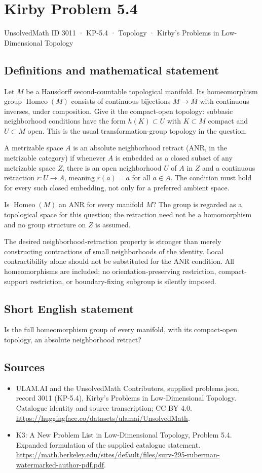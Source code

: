 \documentclass[11pt,a4paper]{article}
\begin{document}
\section*{Kirby Problem 5.4}\label{3011}
{\small UnsolvedMath ID 3011 · KP-5.4 · Topology · Kirby's Problems in Low-Dimensional Topology}
\subsection{Definitions and mathematical statement}
Let $M$ be a Hausdorff second-countable topological manifold.
Its homeomorphism group $\operatorname{Homeo}(M)$ consists of
continuous bijections $M\to M$ with continuous inverses, under
composition. Give it the compact-open topology: subbasic
neighborhood conditions have the form $h(K)\subset U$ with
$K\subset M$ compact and $U\subset M$ open. This is the
usual transformation-group topology in the question.

A metrizable space $A$ is an absolute neighborhood retract
(ANR, in the metrizable category) if whenever $A$ is embedded
as a closed subset of any metrizable space $Z$, there is an
open neighborhood $U$ of $A$ in $Z$ and a continuous
retraction $r:U\to A$, meaning $r(a)=a$ for all $a\in A$.
The condition must hold for every such closed embedding, not
only for a preferred ambient space.

Is $\operatorname{Homeo}(M)$ an ANR for every manifold $M$?
The group is regarded as a topological space for this question;
the retraction need not be a homomorphism and no group structure
on $Z$ is assumed.

The desired neighborhood-retraction property is stronger than
merely constructing contractions of small neighborhoods of the
identity. Local contractibility alone should not be substituted
for the ANR condition. All homeomorphisms are included; no
orientation-preserving restriction, compact-support restriction, or
boundary-fixing subgroup is silently imposed.
\subsection{Short English statement}
Is the full homeomorphism group of every manifold, with its compact-open topology, an absolute neighborhood retract?
\subsection{Sources}
\begin{itemize}
\item[S1] ULAM.AI and the UnsolvedMath Contributors, supplied problems.json, record 3011 (KP-5.4), Kirby's Problems in Low-Dimensional Topology. Catalogue identity and source transcription; CC BY 4.0.
\url{https://huggingface.co/datasets/ulamai/UnsolvedMath}.
\item[S2] K3: A New Problem List in Low-Dimensional Topology, Problem 5.4. Expanded formulation of the supplied catalogue statement.
\url{https://math.berkeley.edu/sites/default/files/surv-295-ruberman-watermarked-author-pdf.pdf}.
\end{itemize}
\end{document}
